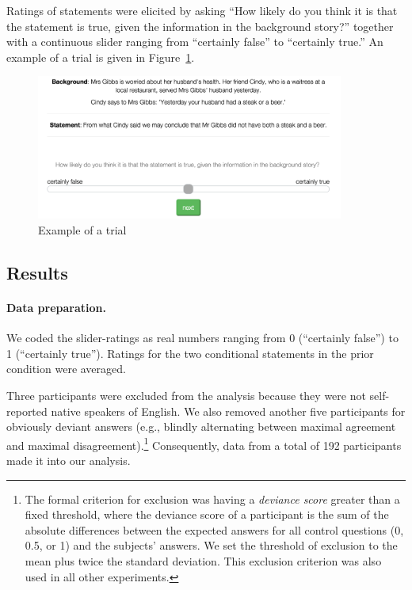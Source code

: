 \documentclass[12pt]{article}
\begin{document}
Ratings of statements were elicited by asking ``How likely do you think it is that the
statement is true, given the information in the background story?'' together with a continuous
slider ranging from ``certainly false'' to ``certainly true.'' An example of a trial is given
in Figure~\ref{fig:exampleShot}.

\begin{figure}
  \centering
  \includegraphics[width = 0.9\textwidth]{pics/expExampleShot.png}
  \caption{Example of a trial }
  \label{fig:exampleShot}
\end{figure}

\subsection*{Results}

\paragraph{Data preparation.} We coded the slider-ratings as real numbers ranging from 0
(``certainly false'') to 1 (``certainly true''). Ratings for the two conditional statements in
the prior condition were averaged.

Three participants were excluded from the analysis because they were not self-reported native
speakers of English. We also removed another five participants for obviously deviant answers
(e.g., blindly alternating between maximal agreement and maximal disagreement).\footnote{The
  formal criterion for exclusion was having a \emph{deviance score} greater than a fixed
  threshold, where the deviance score of a participant is the sum of the absolute differences
  between the expected answers for all control questions (0, 0.5, or 1) and the subjects'
  answers. %
  We set the threshold of exclusion to the mean plus twice the standard deviation. This
  exclusion criterion was also used in all other experiments.}  Consequently, data from a total
of 192 participants made it into our analysis.
\end{document}
